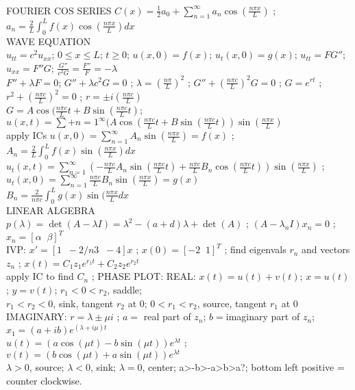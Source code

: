 \documentclass{article}
\begin{document}
\begin{large}
\\FOURIER COS SERIES $C(x)=\frac{1}{2}a_0+\sum_{n=1}^\infty a_n\cos(\frac{n\pi x}{L})$ ; $a_n=\frac{2}{L}\int_0^Lf(x)\cos(\frac{n\pi x}{L})dx$
\\WAVE EQUATION
\\$u_{tt}=c^2u_{xx}$; $0\le x\le L$; $t\ge0$; $u(x,0)=f(x)$; $u_t(x,0)=g(x)$; $u_{tt}=FG''$; $u_{xx}=F''G$; $\frac{G''}{c^2G}=\frac{F''}{F}=-\lambda$
\\$F''+\lambda F=0$; $G''+\lambda c^2G=0$ ; $\lambda=(\frac{n\pi}{L})^2$ ; $G''+(\frac{n\pi c}{L})^2G=0$ ; $G=e^{rt}$ ; $r^2+(\frac{n\pi c}{L})^2=0$ ; $r=\pm i(\frac{n\pi c}{L})$
\\$G=A\cos(\frac{n\pi c}{L}t+B\sin(\frac{n\pi c}{L}t)$; $u(x,t)=\sum+{n=1}^\infty(A\cos(\frac{n\pi c}{L}t+B\sin(\frac{n\pi c}{L}t))\sin(\frac{n\pi x}{L})$
\\apply ICs $u(x,0)=\sum_{n=1}^\infty A_n\sin(\frac{n\pi x}{L})=f(x)$ ; $A_n=\frac{2}{L}\int_0^Lf(x)\sin(\frac{n\pi x}{L})dx$
\\$u_t(x,t)=\sum_{n=1}^\infty(-\frac{n\pi c}{L}A_n\sin(\frac{n\pi c}{L}t)+\frac{n\pi c}{L}B_n\cos(\frac{n\pi c}{L}t))\sin(\frac{n\pi x}{L})$ ; $u_t(x,0)=\sum_{n=1}^\infty\frac{n\pi c}{L}B_n\sin(\frac{n\pi x}{L})=g(x)$
\\$B_n=\frac{2}{n\pi c}\int_0^Lg(x)\sin(\frac{n\pi x}{L}dx$
\\LINEAR ALGEBRA 
\\$p(\lambda)=\det(A-\lambda I)=\lambda^2-(a+d)\lambda+\det(A)$ ; $(A-\lambda_nI)x_n=0$ ; $x_n=[\alpha\;\;\beta]^T$
\\IVP: $x'=[1\;\;-2 /n 3\;\;-4]x$ ; $x(0)=[-2\;\;1]^T$ ; find eigenvals $r_n$ and vectors $z_n$ ; $x(t)=C_1z_1e^{r_1t}+C_2z_2e^{r_2t}$
\\apply IC to find $C_n$ ; PHASE PLOT: REAL: $x(t)=u(t)+v(t)$; $x=u(t)$; $y=v(t)$; $r_1<0<r_2$, saddle; 
\\$r_1<r_2<0$, sink, tangent  $r_2$ at $0$; $0<r_1<r_2$, source, tangent $r_1$ at $0$
\\IMAGINARY: $r=\lambda\pm\mu i$ ; $a=$ real part of $z_n$; $b=$imaginary part of $z_n$; $x_1=(a+ib)e^{(\lambda+i\mu)t}$
\\$u(t)=(a\cos(\mu t)-b\sin(\mu t))e^{\lambda t}$ ; $v(t)=(b\cos(\mu t)+a\sin(\mu t))e^{\lambda t}$
\\$\lambda>0$, source; $\lambda<0$, sink; $\lambda=0$, center; a>-b>-a>b>a?; bottom left positive = counter clockwise.














\end{large}
\end{document}
